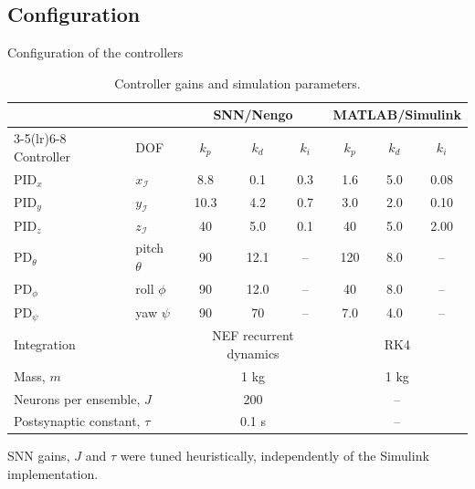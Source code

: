 \documentclass{beamer}
\begin{document}
\subsection{Configuration}
\begin{frame}{Configuration of the controllers}
\begin{table}[htb!]
\centering
\caption{Controller gains and simulation parameters.}
\scriptsize
\begin{tabular}{llccc@{\hspace{9pt}}ccc}
\toprule
& & \multicolumn{3}{c}{SNN/Nengo} & \multicolumn{3}{c}{MATLAB/Simulink} \\
\cmidrule(lr){3-5}\cmidrule(lr){6-8}
Controller & DOF & $k_p$ & $k_d$ & $k_i$ & $k_p$ & $k_d$ & $k_i$ \\
\midrule
PID$_x$       & $x_\mathcal{I}$  & 8.8  & 0.1  & 0.3  & 1.6 & 5.0 & 0.08 \\
PID$_y$       & $y_\mathcal{I}$  & 10.3 & 4.2  & 0.7  & 3.0 & 2.0 & 0.10 \\
PID$_z$       & $z_\mathcal{I}$  & 40   & 5.0  & 0.1  & 40  & 5.0 & 2.00 \\
PD$_\theta$   & pitch $\theta$   & 90   & 12.1 & --   & 120 & 8.0 & -- \\
PD$_\phi$     & roll $\phi$      & 90   & 12.0 & --   & 40  & 8.0 & -- \\
PD$_\psi$     & yaw $\psi$       & 90   & 70   & --   & 7.0 & 4.0 & -- \\
\midrule
\multicolumn{2}{l}{Integration} & \multicolumn{3}{c}{NEF recurrent dynamics} & \multicolumn{3}{c}{RK4} \\
\multicolumn{2}{l}{Mass, $m$} & \multicolumn{3}{c}{1 kg} & \multicolumn{3}{c}{1 kg} \\
\multicolumn{2}{l}{Neurons per ensemble, $J$} & \multicolumn{3}{c}{200} & \multicolumn{3}{c}{--} \\
\multicolumn{2}{l}{Postsynaptic constant, $\tau$} & \multicolumn{3}{c}{0.1 s} & \multicolumn{3}{c}{--} \\
\bottomrule
\end{tabular}
\end{table}
\scriptsize SNN gains, $J$ and $\tau$ were tuned heuristically, independently of the Simulink implementation.
\end{frame}
\end{document}
